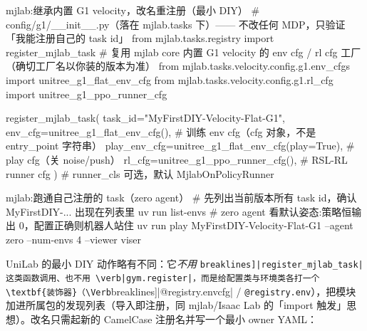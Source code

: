 \begin{codebox}[Python]{mjlab:继承内置 G1 velocity，改名重注册（最小 DIY）}
# config/g1/__init__.py（落在 mjlab.tasks 下）—— 不改任何 MDP，只验证「我能注册自己的 task id」
from mjlab.tasks.registry import register_mjlab_task
# 复用 mjlab core 内置 G1 velocity 的 env cfg / rl cfg 工厂（确切工厂名以你装的版本为准）
from mjlab.tasks.velocity.config.g1.env_cfgs import unitree_g1_flat_env_cfg
from mjlab.tasks.velocity.config.g1.rl_cfg import unitree_g1_ppo_runner_cfg

register_mjlab_task(
    task_id="MyFirstDIY-Velocity-Flat-G1",
    env_cfg=unitree_g1_flat_env_cfg(),                  # 训练 env cfg（cfg 对象，不是 entry_point 字符串）
    play_env_cfg=unitree_g1_flat_env_cfg(play=True),    # play cfg（关 noise/push）
    rl_cfg=unitree_g1_ppo_runner_cfg(),                 # RSL-RL runner cfg
)   # runner_cls 可选，默认 MjlabOnPolicyRunner
\end{codebox}

\begin{codebox}[bash]{mjlab:跑通自己注册的 task（zero agent）}
# 先列出当前版本所有 task id，确认 MyFirstDIY-... 出现在列表里
uv run list-envs
# zero agent 看默认姿态:策略恒输出 0，配置正确则机器人站住
uv run play MyFirstDIY-Velocity-Flat-G1 --agent zero --num-envs 4 --viewer viser
\end{codebox}


UniLab 的最小 DIY 动作略有不同：它\emph{不用} \Verb[breaklines]|register_mjlab_task| 这类函数调用、也不用 \verb|gym.register|，而是给配置类与环境类各打一个\textbf{装饰器}（\Verb[breaklines]|@registry.envcfg| / \verb|@registry.env|），把模块加进所属包的发现列表（导入即注册，同 mjlab/Isaac Lab 的「import 触发」思想）。改名只需起新的 CamelCase 注册名并写一个最小 owner YAML：

